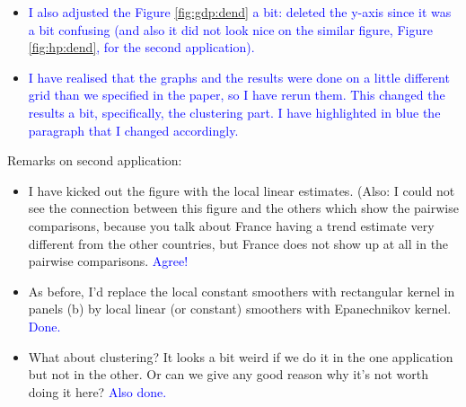 \documentclass[a4paper,12pt]{article}
\begin{document}
{\begin{itemize}
\item \textcolor{blue}{I also adjusted the Figure \ref{fig:gdp:dend} a bit: deleted the y-axis since it was a bit confusing (and also it did not look nice on the similar figure, Figure \ref{fig:hp:dend}, for the second application).}
\item \textcolor{blue}{I have realised that the graphs and the results were done on a little different grid than we specified in the paper, so I have rerun them. This changed the results a bit, specifically, the clustering part. I have highlighted in blue the paragraph that I changed accordingly.}
\end{itemize}

Remarks on second application: 
\begin{itemize}
\item I have kicked out the figure with the local linear estimates. (Also: I could not see the connection between this figure and the others which show the pairwise comparisons, because you talk about France having a trend estimate very different from the other countries, but France does not show up at all in the pairwise comparisons. \textcolor{blue}{Agree!}
\item As before, I'd replace the local constant smoothers with rectangular kernel in panels (b) by local linear (or constant) smoothers with Epanechnikov kernel. \textcolor{blue}{Done.}
\item What about clustering? It looks a bit weird if we do it in the one application but not in the other. Or can we give any good reason why it's not worth doing it here? \textcolor{blue}{Also done.}
\end{itemize}
}
\newpage
\end{document}
